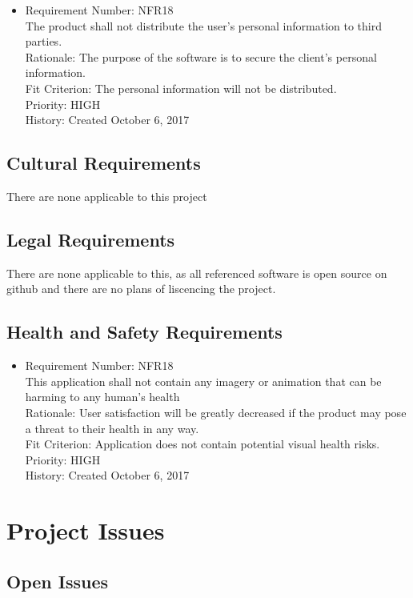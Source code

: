 \documentclass[12pt, titlepage]{article}
\begin{document}
\begin{itemize}
	\item Requirement Number: NFR18\\
The product shall not distribute the user’s personal information to third parties.\\
Rationale: The purpose of the software is to secure the client’s personal information.\\
Fit Criterion: The personal information will not be distributed.\\
Priority: HIGH\\
History: Created October 6, 2017
	
\end{itemize}

\subsection{Cultural Requirements}
There are none applicable to this project

\subsection{Legal Requirements}

There are none applicable to this, as all referenced software is open source on github and there are no plans of liscencing the project.

\subsection{Health and Safety Requirements}
\begin{itemize}
	\item Requirement Number: NFR18\\
This application shall not contain any imagery or animation that can be harming to any human's health\\
Rationale: User satisfaction will be greatly decreased if the product may pose a threat to their health in any way.\\
Fit Criterion: Application does not contain potential visual health risks.\\
Priority: HIGH\\
History: Created October 6, 2017
\end{itemize}

\section{Project Issues}

\subsection{Open Issues}
\end{document}
